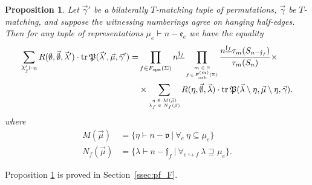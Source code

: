 \documentclass{amsart}
\newtheorem{proposition}[conjecture]{Proposition}
\newcommand{\Fspx}{F_{\textnormal{spx}}}
\newcommand{\Forb}[1][m]{F^{(#1)}_{\textnormal{orb}}}
\newcommand{\iterorb}{{\tiny\begin{matrix}m\in\mathbb{N}\\f\!\in\!\Forb(\Sigma)\end{matrix}}}
\newcommand{\tr}{\operatorname{tr}}
\begin{document}
\begin{proposition}\label{prop:count_F}
Let $\vec\gamma'$ be a bilaterally $T$-matching tuple of permutations, $\vec\gamma$ be $T$-matching, and suppose the witnessing numberings agree on hanging half-edges. Then for any tuple of representations $\mu_e\vdash n-\mathfrak{e}_e$ we have the equality
\begin{align*}
\sum_{\lambda'_f\vdash n}R(\emptyset,\vec\emptyset,\vec\lambda')\cdot\tr\mathfrak{P}(\vec\lambda',\vec\mu,\vec\gamma')=&\prod_{f\in\Fspx(\Sigma)}n^{\underline{\mathfrak{f}_f}}\prod_\iterorb\frac{n^{\underline{\mathfrak{f}_f}}\tau_m(S_{n-\mathfrak{f}_f})}{\tau_m(S_n)}\times\\
&\times\sum_{\tiny\begin{matrix}\eta\in M(\vec\mu)\\\lambda_f\in N_f(\vec\mu)\end{matrix}}R(\eta,\vec\emptyset,\vec\lambda)\cdot\tr\mathfrak{P}(\vec\lambda\setminus\eta,\vec\mu\setminus\eta,\vec\gamma).
\end{align*}
where
\begin{align*}
M(\vec\mu)&=\{\eta\vdash n-\mathfrak{v}\ |\ \forall_e\ \eta\subseteq\mu_e\}\\
N_f(\vec\mu)&=\{\lambda\vdash n-\mathfrak{f}_f\ |\ \forall_{e\hookrightarrow f}\ \lambda\supseteq\mu_e\}.
\end{align*}
\end{proposition}
Proposition \ref{prop:count_F} is proved in Section~\ref{ssec:pf_F}.

\medskip
\end{document}
